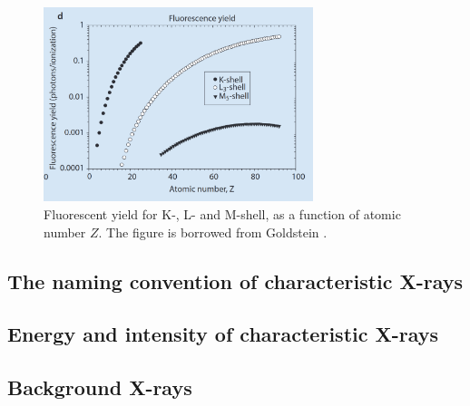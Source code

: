 \begin{figure}[ht]
    \centering
    \includegraphics[width=0.7\textwidth]{figures/fluorescence_yield_Goldstein_Fig4-3-d.png}
    \caption{
        Fluorescent yield for K-, L- and M-shell, as a function of atomic number $Z$.
        The figure is borrowed from Goldstein \cite[Fig. 4.3 (d)]{goldstein_scanning_2018}.
    }
    \label{fig:theory:fluorescence_yield}
\end{figure}








\subsection{The naming convention of characteristic X-rays}
\label{theory:xray_formation:naming}



\subsection{Energy and intensity of characteristic X-rays}
\label{theory:xray_formation:energy_intensity}








\subsection{Background X-rays}
\label{theory:xray_formation:background}

